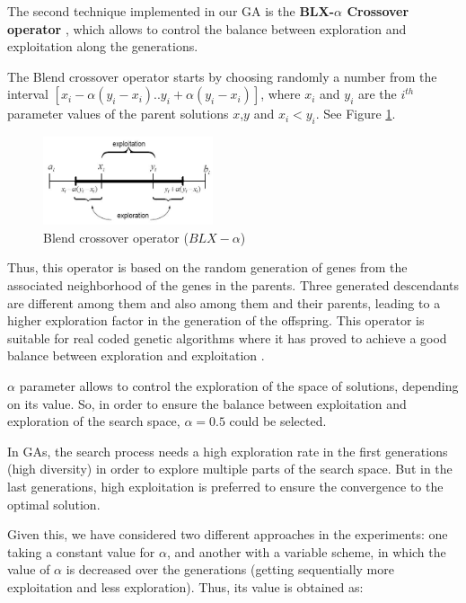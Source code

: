 \documentclass[10pt,journal,compsoc]{IEEEtran}
\begin{document}
The second technique implemented in our GA is the \textbf{BLX-$\alpha$ Crossover operator} \cite{blx2008}, which allows to control the balance between exploration and exploitation along the generations.

The Blend crossover operator starts by choosing randomly a number from the interval $[x_i-\alpha(y_i-x_i).. y_i+\alpha(y_i-x_i)]$, where $x_i$ and $y_i$ are the $i^{th}$ parameter values of the parent solutions $x$,$y$ and $x_i < y_i$. See Figure \ref{fig:blxalpha}.

 \begin{figure}[!ht]	
 	\begin{center}
 		\includegraphics[width=5cm]{fig/blxalpha.jpg}
 		\caption{Blend crossover operator ($BLX-\alpha$)}
 		\label{fig:blxalpha}	
 	\end{center}	
 \end{figure}

Thus, this operator is based on the random generation of genes from the associated neighborhood of the genes in the parents. Three generated descendants are different among them and also among them and their parents, leading to a higher exploration factor in the generation of the offspring.
This operator is suitable for real coded genetic algorithms where it has proved to achieve a good balance between exploration and exploitation \cite{blx2008}.

$\alpha$ parameter allows to control the exploration of the space of solutions, depending on its value. So, in order to ensure the balance between exploitation and exploration of the search space, $\alpha = 0.5$ could be selected.

In GAs, the search process needs a high exploration rate in the first generations (high diversity) in order to explore multiple parts of the search space. But in the last generations, high exploitation is preferred to ensure the convergence to the optimal solution.

Given this, we have considered two different approaches in the experiments: one taking a constant value for $\alpha$, and another with a variable scheme, in which the value of $\alpha$ is decreased over the generations (getting sequentially more exploitation and less exploration). Thus, its value is obtained as:
\end{document}
